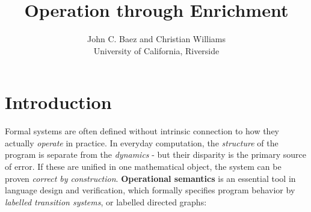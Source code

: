 \documentclass[a4paper,UKenglish]{article}
\theoremstyle{definition}
\begin{document}
\title{Operation through Enrichment}
\author{John C. Baez and Christian Williams\\University of California, Riverside}

\maketitle

\section{Introduction}

%

Formal systems are often defined without intrinsic connection to how they actually \textit{operate} in practice. In everyday computation, the \textit{structure} of the program is separate from the \textit{dynamics} - but their disparity is the primary source of error. If these are unified in one mathematical object, the system can be proven \textit{correct by construction}. \textbf{Operational semantics} \cite{sos} is an essential tool in language design and verification, which formally specifies program behavior by \textit{labelled transition systems}, or labelled directed graphs:
\begin{center}\end{center}
\end{document}
